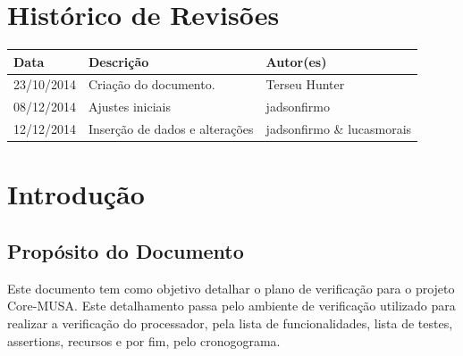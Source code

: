 \documentclass{article}
\begin{document}
\capa

  \section*{\center Histórico de Revisões}
  \vspace*{1cm}
  \begin{center} %
    \begin{longtable}[pos]{|m{2cm} | m{7.2cm} | m{3.8cm}|} 
      \hline %
      \cellcolor[gray]{0.9}
      \textbf{Data} & \cellcolor[gray]{0.9}\textbf{Descrição} & \cellcolor[gray]{0.9}\textbf{Autor(es)}\\ \hline
      \hline
      \small 23/10/2014 & \small Criação do documento. & \small Terseu Hunter \\ \hline
      \hline
      \small 08/12/2014 & \small Ajustes iniciais & \small jadsonfirmo \\ \hline 
      \small 12/12/2014 & \small Inserção de dados e alterações & \small jadsonfirmo \& lucasmorais \\ \hline 
    \end{longtable}
  \end{center}

  \newpage
  \tableofcontents
  \newpage

  \section{Introdução}

	\subsection{Propósito do Documento}
	Este documento tem como objetivo detalhar o plano de verificação para o projeto Core-MUSA. Este detalhamento passa pelo ambiente de verificação utilizado para realizar a verificação do processador, pela lista de funcionalidades, lista de testes, assertions, recursos e por fim, pelo cronogograma.
	
\end{document}
